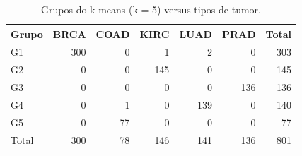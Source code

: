 \begin{table}[htbp]
\caption{Grupos do k-means (k = 5) versus tipos de tumor.}
\label{tab:contingencia_kmeans}
\begin{tabular}{lrrrrrr}
\toprule
Grupo & BRCA & COAD & KIRC & LUAD & PRAD & Total \\
\midrule
G1 & 300 & 0 & 1 & 2 & 0 & 303 \\
G2 & 0 & 0 & 145 & 0 & 0 & 145 \\
G3 & 0 & 0 & 0 & 0 & 136 & 136 \\
G4 & 0 & 1 & 0 & 139 & 0 & 140 \\
G5 & 0 & 77 & 0 & 0 & 0 & 77 \\
Total & 300 & 78 & 146 & 141 & 136 & 801 \\
\bottomrule
\end{tabular}
\end{table}
